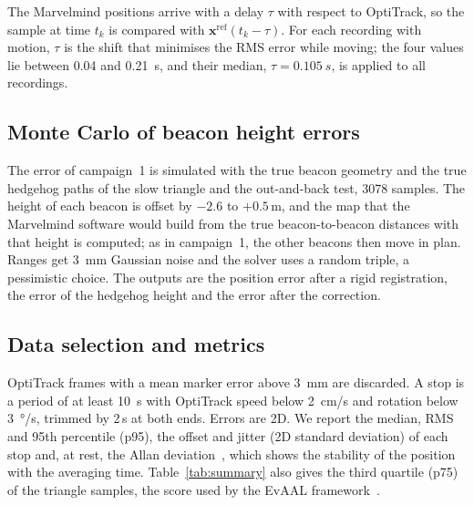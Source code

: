 \documentclass[conference]{IEEEtran}
\begin{document}
The Marvelmind positions arrive with a delay $\tau$ with respect to OptiTrack, so the sample at time
$t_k$ is compared with $\mathbf{x}^{\mathrm{ref}}(t_k-\tau)$. For each recording with motion, $\tau$ is
the shift that minimises the RMS error while moving; the four values lie between 0.04 and
\SI{0.21}{s}, and their median, $\tau=\SI{0.105}{s}$, is applied to all recordings.

\subsection{Monte Carlo of beacon height errors}
The error of campaign~1 is simulated with the true beacon geometry and the true hedgehog paths of the slow
triangle and the out-and-back test, 3078 samples. The height of each beacon is offset by $-2.6$ to
$+0.5$\,m, and the map that the Marvelmind software would build from the true beacon-to-beacon
distances with that height is computed; as in campaign~1, the other beacons then move in plan. Ranges
get \SI{3}{mm} Gaussian noise and the solver uses a random triple, a pessimistic choice. The outputs
are the position error after a rigid registration, the error of the hedgehog height and the error after
the correction.

\subsection{Data selection and metrics}
OptiTrack frames with a mean marker error above \SI{3}{mm} are discarded. A stop is a period of at least
\SI{10}{s} with OptiTrack speed below \SI{2}{cm/s} and rotation below \SI{3}{\degree/s}, trimmed by
2\,s at both ends. Errors are 2D. We report the median, RMS and 95th percentile (p95), the offset and
jitter (2D standard deviation) of each stop and, at rest, the Allan deviation~\cite{allan1966statistics}, which shows the
stability of the position with the averaging time. Table~\ref{tab:summary} also gives the third quartile (p75) of the triangle
samples, the score used by the EvAAL framework~\cite{potorti2017comparing}.
\end{document}
